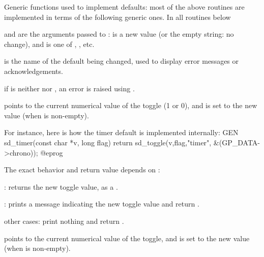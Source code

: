 




\noindent Generic functions used to implement defaults: most of the above
routines are implemented in terms of the following generic ones. In all
routines below

\item {} and  are the arguments passed to :
 is a new value (or the empty string: no change), and  is one
of , , etc.

\item {} is the name of the default being changed, used to display error
messages or acknowledgements.


\item if  is neither  nor , an error is raised using
.

\item {} points to the current numerical value of the toggle (1 or 0),
and is set to the new value (when  is non-empty).

For instance, here is how the timer default is implemented internally:
\bprog
GEN
sd_timer(const char *v, long flag)
{ return sd_toggle(v,flag,"timer", &(GP_DATA->chrono)); }
@eprog

The exact behavior and return value depends on :

\item {}: returns the new toggle value, as a .

\item {}: prints a message indicating the new toggle value
and return .

\item other cases: print nothing and return .



\item {} points to the current numerical value of the toggle, and is set
to the new value (when  is non-empty).

